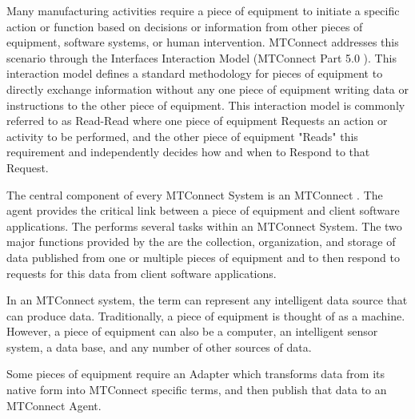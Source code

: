 Many manufacturing activities require a piece of equipment to initiate a specific action or function based on decisions or information from other pieces of equipment, software systems, or human intervention. MTConnect addresses this scenario through the Interfaces Interaction Model (MTConnect Part 5.0 \cite{MTCPart5}).   This interaction model defines a standard methodology for pieces of equipment to directly exchange information without any one piece of equipment writing data or instructions to the other piece of equipment. This interaction model is commonly referred to as Read-Read where one piece of equipment Requests an action or activity to be performed, and the other piece of equipment "Reads" this requirement and independently decides how and when to Respond to that Request. 

The central component of every MTConnect System is an MTConnect .  The agent provides the critical link between a piece of equipment and client software applications. The  performs several tasks within an MTConnect System.   The two major functions provided by the  are the collection, organization, and storage of data published from one or multiple pieces of equipment and to then respond to requests for this data from client software applications. 


\FloatBarrier
 
In an MTConnect system, the term  can represent any intelligent data source that can produce data.  Traditionally, a piece of equipment is thought of as a machine. However, a piece of equipment can also be a computer, an intelligent sensor system, a data base, and any number of other sources of data. 
 
Some pieces of equipment require an Adapter which transforms data from its native form into MTConnect specific terms, and then publish that data to an MTConnect Agent.
